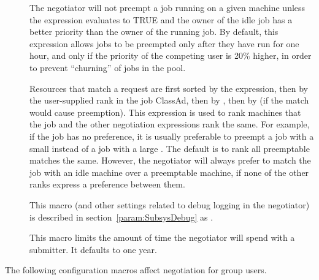 \begin{description}
\item[]
  \label{param:PreemptionRequirements} The negotiator will not preempt
  a job running on a given machine unless the
   expression evaluates to TRUE and the
  owner of the idle job has a better priority than the owner of the
  running job.  By default, this expression allows jobs to be
  preempted only after they have run for one hour, and only if the
  priority of the competing user is 20\% higher, in order to prevent
  ``churning'' of jobs in the pool.

\item[] \label{param:PreemptionRank}
  Resources that match a request are first sorted by the
   expression, then by the
  user-supplied rank in the job ClassAd, then by
  , then by
   (if the match would cause preemption).
  This expression is used to rank machines that the job and the other
  negotiation expressions rank the same.  For example, if the job has
  no preference, it is usually preferable to preempt a job with a
  small  instead of a job with a large
  .  The default is to rank all preemptable matches
  the same.  However, the negotiator will always prefer to match the
  job with an idle machine over a preemptable machine, if none of the
  other ranks express a preference between them.

\item[] \label{param:NegotiatorDebug} This macro
  (and other settings related to debug logging in the negotiator) is
  described in section~\ref{param:SubsysDebug} as .

\item[] \label{param:NegotiatorMaxTimePerSubmitter} This macro limits the amount of time the negotiator will 
spend with a submitter. It defaults to one year.

\end{description}
The following configuration macros affect negotiation for 
group users.
